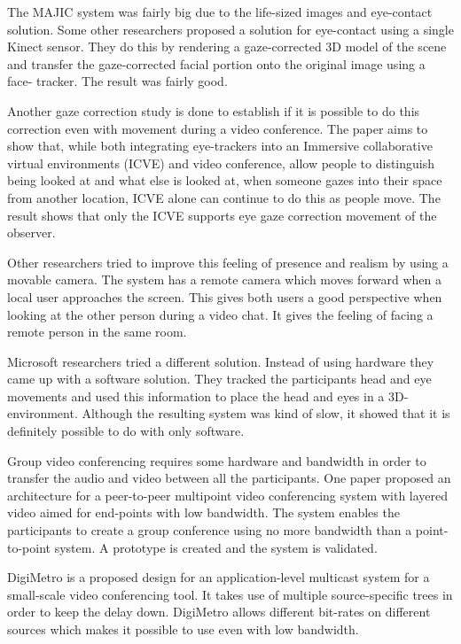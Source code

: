 \documentclass[12pt, titlepage]{article}
\begin{document}
The MAJIC system was fairly big due to the life-sized images and eye-contact solution. Some other researchers proposed a solution for eye-contact using a single Kinect sensor\cite{20}. They do this by rendering a gaze-corrected 3D model of the scene and transfer the gaze-corrected facial portion onto the original image using a face- tracker. The result was fairly good.

Another gaze correction study is done to establish if it is possible to do this correction even with movement during a video conference\cite{21}. The paper aims to show that, while both integrating eye-trackers into an Immersive collaborative virtual
environments (ICVE) and video conference, allow people to distinguish being looked at and what else is looked at, when someone gazes into their space from another location, ICVE alone can continue to do this as people move. The result shows that only the ICVE supports eye gaze correction movement of the observer.

Other researchers tried to improve this feeling of presence and realism by using a movable camera\cite{22}. The system has a remote camera which moves forward when a local user approaches the screen. This gives both users a good perspective when looking at the other person during a video chat. It gives the feeling of facing a remote person in the same room.

Microsoft researchers tried a different solution. Instead of using hardware they came up with a software solution\cite{23}. They tracked the participants head and eye movements and used this information to place the head and eyes in a 3D-environment. Although the resulting system was kind of slow, it showed that it is definitely possible to do with only software.

Group video conferencing requires some hardware and bandwidth in order to transfer the audio and video between all the participants.
One paper proposed an architecture for a peer-to-peer multipoint video conferencing system with layered video aimed for end-points with low bandwidth\cite{24}. The system enables the participants to create a group conference using no more bandwidth than a point-to-point system. A prototype is created and the system is validated.

DigiMetro\cite{25} is a proposed design for an application-level multicast system for a small-scale video conferencing tool. It takes use of multiple source-specific trees in order to keep the delay down. DigiMetro allows different bit-rates on different sources which makes it possible to use even with low bandwidth.
\end{document}
